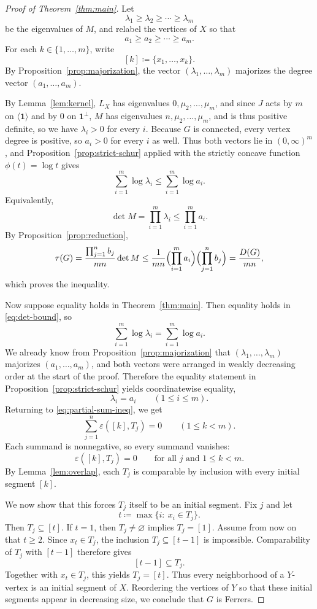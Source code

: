 \documentclass[twoside, reqno]{amsart}
\theoremstyle{definition}
\theoremstyle{remark}
\newcommand{\epsov}{\varepsilon}
\begin{document}
\begin{proof}[Proof of Theorem~\ref{thm:main}]
Let
\[
\lambda_1\ge \lambda_2\ge \cdots \ge \lambda_m
\]
be the eigenvalues of $M$, and relabel the vertices of $X$ so that
\[
a_1\ge a_2\ge \cdots \ge a_m.
\]
For each $k\in\{1,\dots,m\}$, write
\[
[k]\coloneqq \{x_1,\dots,x_k\}.
\]
By Proposition~\ref{prop:majorization}, 
the vector $(\lambda_1,\dots,\lambda_m)$ majorizes 
the degree vector $(a_1,\dots,a_m)$.

By Lemma~\ref{lem:kernel}, $L_X$ has eigenvalues $0,\mu_2,\dots,\mu_m$, 
and since $J$ acts by $m$ on $\langle\mathbf1\rangle$ and by $0$ on 
$\mathbf1^\perp$, $M$ has eigenvalues $n,\mu_2,\dots,\mu_m$, and is 
thus positive definite, so we have $\lambda_i>0$ for every $i$. 
Because $G$ is connected, every vertex degree is positive, so $a_i>0$ 
for every $i$ as well. Thus both vectors lie in $(0,\infty)^m$, and 
Proposition~\ref{prop:strict-schur} applied with the strictly concave 
function $\phi(t)=\log t$ gives
\[
\sum_{i=1}^m \log \lambda_i\le \sum_{i=1}^m \log a_i.
\]
Equivalently,
\[
\det M=\prod_{i=1}^m \lambda_i\le \prod_{i=1}^m a_i.
\]
By Proposition~\ref{prop:reduction},
\[
\tau(G)=\frac{\prod_{j=1}^n b_j}{mn}\det M
\le
\frac{1}{mn}\Bigl(\prod_{i=1}^m a_i\Bigr)\Bigl(\prod_{j=1}^n b_j\Bigr)
=
\frac{D(G)}{mn},
\]
which proves the inequality.

Now suppose equality holds in Theorem~\ref{thm:main}. 
Then equality holds in \eqref{eq:det-bound}, so
\[
\sum_{i=1}^m \log \lambda_i=\sum_{i=1}^m \log a_i.
\]
We already know from Proposition~\ref{prop:majorization} that 
$(\lambda_1,\dots,\lambda_m)$ majorizes $(a_1,\dots,a_m)$, and both 
vectors were arranged in weakly decreasing order at the start of the proof. 
Therefore the equality statement in Proposition~\ref{prop:strict-schur} 
yields coordinatewise equality,
\[
\lambda_i=a_i\qquad (1\le i\le m).
\]
Returning to \eqref{eq:partial-sum-ineq}, we get
\[
\sum_{j=1}^n \epsov([k],T_j)=0
\qquad (1\le k<m).
\]
Each summand is nonnegative, so every summand vanishes:
\[
\epsov([k],T_j)=0
\qquad\text{for all }j\text{ and }1\le k<m.
\]
By Lemma~\ref{lem:overlap}, each $T_j$ is comparable by inclusion with every 
initial segment $[k]$.

We now show that this forces $T_j$ itself to be an initial segment. Fix $j$ and let
\[
t\coloneqq \max\{i:\ x_i\in T_j\}.
\]
Then $T_j\subseteq [t]$. If $t=1$, then $T_j\neq\varnothing$ implies $T_j=[1]$. 
Assume from now on that $t\ge 2$. Since $x_t\in T_j$, the inclusion 
$T_j\subseteq [t-1]$ is impossible. Comparability of $T_j$ with $[t-1]$ 
therefore gives
\[
[t-1]\subseteq T_j.
\]
Together with $x_t\in T_j$, this yields $T_j=[t]$. Thus every neighborhood of 
a $Y$-vertex is an initial segment of $X$. Reordering the vertices of $Y$ so 
that these initial segments appear in decreasing size, 
we conclude that $G$ is Ferrers.


\end{proof}
\end{document}

